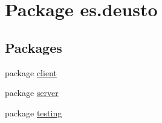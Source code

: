 \hypertarget{namespacees_1_1deusto}{}\section{Package es.\+deusto}
\label{namespacees_1_1deusto}
\subsection*{Packages}
\begin{DoxyCompactItemize}
\item 
package \mbox{\hyperlink{namespacees_1_1deusto_1_1client}{client}}
\item 
package \mbox{\hyperlink{namespacees_1_1deusto_1_1server}{server}}
\item 
package \mbox{\hyperlink{namespacees_1_1deusto_1_1testing}{testing}}
\end{DoxyCompactItemize}
